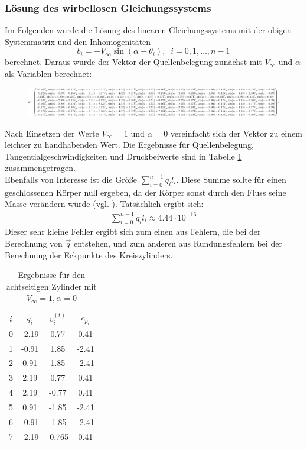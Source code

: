\subsubsection{Lösung des wirbellosen Gleichungssystems}
Im Folgenden wurde die Lösung des linearen Gleichungssystems mit der obigen Systemmatrix und den Inhomogenitäten
\begin{equation}
b_i =  -V_{\infty} \sin{(\alpha -\theta _i)}, \;\; i= 0,1,\ldots, n-1
\end{equation}
berechnet. Daraus wurde der Vektor der Quellenbelegung zunächst mit $V_{\infty}$ und $\alpha $ als Variablen berechnet: \\
\begin{figure}[!h]
\begin{center}
\includegraphics[scale=0.2]{figures/analytical.png} 
\label{fig:analyticalcylinder8}
\end{center}
\end{figure}

Nach Einsetzen der Werte $V_{\infty} = 1$ und $\alpha  = 0$ vereinfacht sich der Vektor zu einem leichter zu handhabenden Wert. Die Ergebnisse für Quellenbelegung, Tangentialgeschwindigkeiten und Druckbeiwerte sind in Tabelle \ref{tab:cyl8} zusammengetragen. \\
Ebenfalls von Interesse ist die Größe $\sum_{i=0}^{n-1} q_i l_i$. Diese Summe sollte für einen geschlossenen Körper null ergeben, da der Körper sonst durch den Fluss seine Masse verändern würde (vgl. \cite{Barba:2019}). Tatsächlich ergibt sich:
\begin{align*}
\sum_{i=0}^{n-1} q_i l_i \approx 4.44 \cdot 10^{-16}
\end{align*}
Dieser sehr kleine Fehler ergibt sich zum einen aus Fehlern, die bei der Berechnung von $\vec q$ entstehen, und zum anderen aus Rundungsfehlern bei der Berechnung der Eckpunkte des Kreiszylinders.

\begin{table}
\caption{Ergebnisse für den achtseitigen Zylinder mit $V_{\infty} = 1, \alpha  = 0$}
\label{tab:cyl8}
\begin{center}
\begin{tabular}{c|ccc}
$i$ & $q_i$ & $v_i^{(t)}$ & $c_{p_i}$ \\
0 & -2.19 & 0.77 & 0.41 \\
1 & -0.91 & 1.85 & -2.41 \\
2 & 0.91 & 1.85 & -2.41 \\
3 & 2.19 & 0.77 & 0.41 \\
4 & 2.19 & -0.77 &  0.41 \\ 
5 &  0.91 & -1.85 & -2.41 \\
6 & -0.91 & -1.85 & -2.41 \\
7 & -2.19 &-0.765 & 0.41
\end{tabular}
\end{center}
\end{table}

